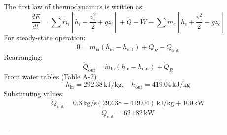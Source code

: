 The first law of thermodynamics is written as:  
\[
\frac{dE}{dt} = \sum \dot{m}_i \left[ h_i + \frac{v_i^2}{2} + g z_i \right] + \dot{Q} - \dot{W} - \sum \dot{m}_e \left[ h_e + \frac{v_e^2}{2} + g z_e \right]
\]  
For steady-state operation:  
\[
0 = \dot{m}_{\text{in}} \left( h_{\text{in}} - h_{\text{out}} \right) + \dot{Q}_R - \dot{Q}_{\text{out}}
\]  
Rearranging:  
\[
\dot{Q}_{\text{out}} = \dot{m}_{\text{in}} \left( h_{\text{in}} - h_{\text{out}} \right) + \dot{Q}_R
\]  
From water tables (Table A-2):  
\[
h_{\text{in}} = 292.38 \, \text{kJ/kg}, \quad h_{\text{out}} = 419.04 \, \text{kJ/kg}
\]  
Substituting values:  
\[
\dot{Q}_{\text{out}} = 0.3 \, \text{kg/s} \left( 292.38 - 419.04 \right) \, \text{kJ/kg} + 100 \, \text{kW}
\]  
\[
\dot{Q}_{\text{out}} = 62.182 \, \text{kW}
\]  

---